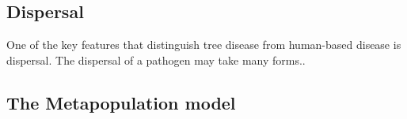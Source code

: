 
\subsection{Dispersal}
\label{ch2:dispersal}
One of the key features that distinguish tree disease from human-based disease is dispersal. The dispersal of a pathogen may take many forms..

\subsection{The Metapopulation model}


